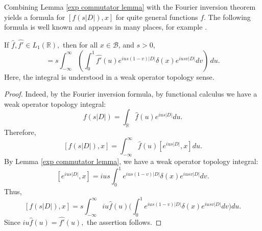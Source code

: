     Combining Lemma \ref{exp commutator lemma} with the Fourier inversion theorem yields a formula for $[f(s|D|),x]$ for quite general functions $f$. The following formula is well known and appears in many places, for example \cite[Theorem 3.2.32]{Bratteli-Robinson1}.
    \begin{lem}\label{first commutator rep lemma} 
        If $\widehat{f},\widehat{f'}\in L_1(\mathbb{R}),$ then for all $x \in \mathcal{B}$, and $s > 0$,
        \begin{equation*}
            [f(s|D|),x] = s\int_{-\infty}^{\infty}\left(\int_0^1\widehat{f'}(u)e^{ius(1-v)|D|}\delta(x)e^{iusv|D|}dv\right)\,du.
        \end{equation*}
        Here, the integral is understood in a weak operator topology sense.
    \end{lem}
    \begin{proof} 
        Indeed, by the Fourier inversion formula, by functional calculus we have a weak operator topology integral:
        $$f(s|D|)=\int_{\mathbb{R}}\widehat{f}(u)e^{ius|D|}du.$$
        Therefore,
        $$[f(s|D|),x]=\int_{-\infty}^{\infty}\widehat{f}(u)[e^{ius|D|},x]du.$$
        By Lemma \ref{exp commutator lemma}, we have a weak operator topology integral:
        $$[e^{ius|D|},x] = ius\int_0^1e^{ius(1-v)|D|}\delta(x)e^{iusv|D|}dv.$$
        Thus,
        $$[f(s|D|),x]=s\int_{-\infty}^{\infty}iu\widehat{f}(u)\Big(\int_0^1e^{ius(1-v)|D|}\delta(x)e^{iusv|D|}dv\Big)du.$$
        Since $iu\widehat{f}(u)=\widehat{f'}(u),$ the assertion follows.
    \end{proof}
    
